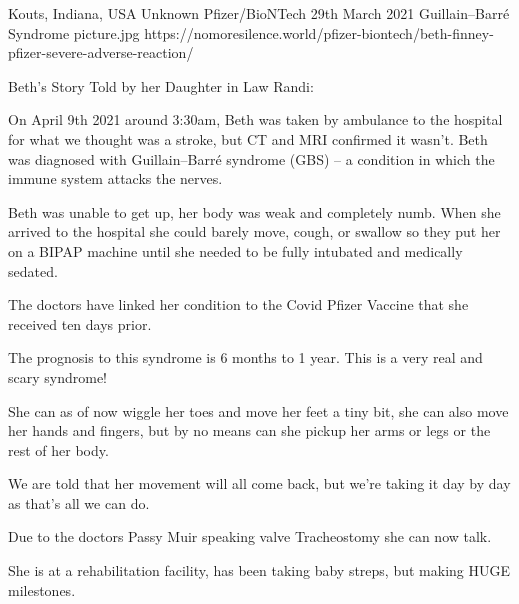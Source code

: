 {Kouts, Indiana, USA}
{Unknown}
{Pfizer/BioNTech}
{29th March 2021}
{Guillain–Barré Syndrome}
{picture.jpg}
{https://nomoresilence.world/pfizer-biontech/beth-finney-pfizer-severe-adverse-reaction/}
{

Beth’s Story Told by her Daughter in Law Randi:

On April 9th 2021 around 3:30am, Beth was taken by ambulance to the hospital for
what we thought was a stroke, but CT and MRI confirmed it wasn’t. Beth was
diagnosed with Guillain–Barré syndrome (GBS) – a condition in which the immune
system attacks the nerves.

Beth was unable to get up, her body was weak and completely numb. When she
arrived to the hospital she could barely move, cough, or swallow so they put her
on a BIPAP machine until she needed to be fully intubated and medically sedated.

The doctors have linked her condition to the Covid Pfizer Vaccine that she
received ten days prior.

The prognosis to this syndrome is 6 months to 1 year. This is a very real and
scary syndrome!

She can as of now wiggle her toes and move her feet a tiny bit, she can also
move her hands and fingers, but by no means can she pickup her arms or legs or
the rest of her body.

We are told that her movement will all come back, but we’re taking it day by day
as that’s all we can do.

Due to the doctors Passy Muir speaking valve Tracheostomy she can now talk.

She is at a rehabilitation facility, has been taking baby streps, but making
HUGE milestones.

}
